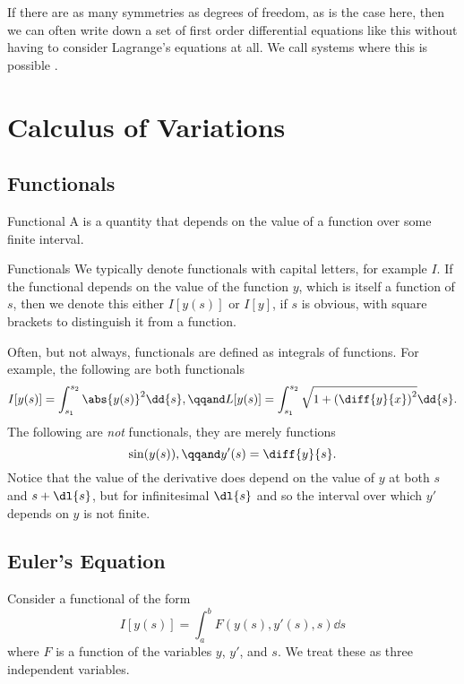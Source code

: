 \documentclass[fleqn]{NotesClass}
\begin{document}
    If there are as many symmetries as degrees of freedom, as is the case here, then we can often write down a set of first order differential equations like this without having to consider Lagrange's equations at all.
    We call systems where this is possible .
    
    \chapter{Calculus of Variations}
    \section{Functionals}
    \begin{dfn}{Functional}{}
        A  is a quantity that depends on the value of a function over some finite interval.
    \end{dfn}
    \begin{ntn}{Functionals}{}
        We typically denote functionals with capital letters, for example \(I\).
        If the functional depends on the value of the function \(y\), which is itself a function of \(s\), then we denote this either \(I[y(s)]\) or \(I[y]\), if \(s\) is obvious, with square brackets to distinguish it from a function.
    \end{ntn}
    
    Often, but not always, functionals are defined as integrals of functions.
    For example, the following are both functionals
    \begin{equation}
        I[y(s)] = \int_{s_1}^{s_2} \abs{y(s)}^2 \dd{s}, \qqand L[y(s)] = \int_{s_1}^{s_2} \sqrt{1 + \left( \diff{y}{x} \right)^2} \dd{s}.
    \end{equation}
    The following are \emph{not} functionals, they are merely functions
    \begin{equation}
        \sin(y(s)), \qqand y'(s) = \diff{y}{s}.
    \end{equation}
    Notice that the value of the derivative does depend on the value of \(y\) at both \(s\) and \(s + \dl{s}\), but for infinitesimal \(\dl{s}\) and so the interval over which \(y'\) depends on \(y\) is not finite.
    
    \section{Euler's Equation}\label{sec:Euler's equation}
    Consider a functional of the form
    \begin{equation}
        I[y(s)] = \int_a^b F(y(s), y'(s), s) \dd{s}
    \end{equation}
    where \(F\) is a function of the variables \(y\), \(y'\), and \(s\).
    We treat these as three independent variables.
    
\end{document}
